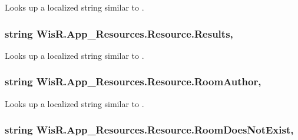 Looks up a localized string similar to . 

\hypertarget{class_wis_r_1_1_app___resources_1_1_resource_a91e77ae8d9d5371de5fbb386ef7b6398}{}
\subsubsection[{Results}]{\setlength{\rightskip}{0pt plus 5cm}string Wis\+R.\+App\+\_\+\+Resources.\+Resource.\+Results\hspace{0.3cm}{\ttfamily [static]}, {\ttfamily [get]}}\label{class_wis_r_1_1_app___resources_1_1_resource_a91e77ae8d9d5371de5fbb386ef7b6398}


Looks up a localized string similar to . 

\hypertarget{class_wis_r_1_1_app___resources_1_1_resource_a96b60c71774b8de529c2da3bb464f844}{}
\subsubsection[{Room\+Author}]{\setlength{\rightskip}{0pt plus 5cm}string Wis\+R.\+App\+\_\+\+Resources.\+Resource.\+Room\+Author\hspace{0.3cm}{\ttfamily [static]}, {\ttfamily [get]}}\label{class_wis_r_1_1_app___resources_1_1_resource_a96b60c71774b8de529c2da3bb464f844}


Looks up a localized string similar to . 

\hypertarget{class_wis_r_1_1_app___resources_1_1_resource_a875fa19e53670abe241170ba073ee4b3}{}
\subsubsection[{Room\+Does\+Not\+Exist}]{\setlength{\rightskip}{0pt plus 5cm}string Wis\+R.\+App\+\_\+\+Resources.\+Resource.\+Room\+Does\+Not\+Exist\hspace{0.3cm}{\ttfamily [static]}, {\ttfamily [get]}}\label{class_wis_r_1_1_app___resources_1_1_resource_a875fa19e53670abe241170ba073ee4b3}


